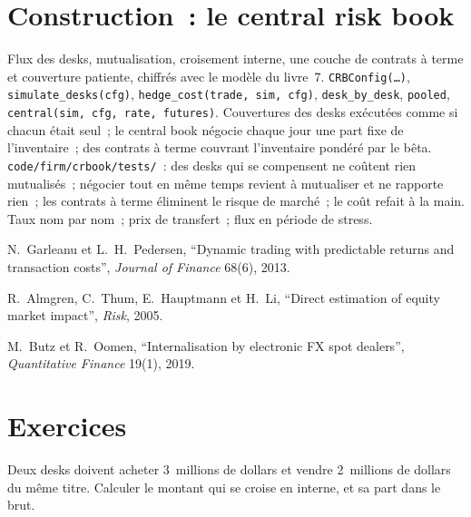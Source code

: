 \section{Construction~: le central risk book}\label{bld:s2:the-central-risk-book:crbook}

\begin{build}
 Flux des desks, mutualisation, croisement interne, une couche de contrats à terme et couverture patiente, chiffrés avec le modèle du livre~7.
 \texttt{CRBConfig(\dots)}, \texttt{simulate\_desks(cfg)}, \texttt{hedge\_cost(trade, sim, cfg)}, \texttt{desk\_by\_desk},
\texttt{pooled}, \texttt{central(sim, cfg, rate, futures)}.
 Couvertures des desks exécutées comme si chacun était seul~; le central book négocie chaque jour une part fixe de l'inventaire~; des contrats à terme
couvrant l'inventaire pondéré par le bêta.
 \texttt{code/firm/crbook/tests/}~: des desks qui se compensent ne coûtent rien mutualisés~; négocier tout en même temps revient à mutualiser et
ne rapporte rien~; les contrats à terme éliminent le risque de marché~; le coût refait à la main.
 Taux nom par nom~; prix de transfert~; flux en période de stress.
\end{build}

\begin{omsources}
\item N.~Garleanu et L.~H.~Pedersen, ``Dynamic trading with predictable returns and transaction costs'', \emph{Journal of Finance} 68(6), 2013.
\item R.~Almgren, C.~Thum, E.~Hauptmann et H.~Li, ``Direct estimation of equity market impact'', \emph{Risk}, 2005.
\item M.~Butz et R.~Oomen, ``Internalisation by electronic FX spot dealers'', \emph{Quantitative Finance} 19(1), 2019.
\end{omsources}

\section{Exercices}

\begin{exercise}[$\star$]\label{exo:s2:the-central-risk-book:1}
Deux desks doivent acheter 3~millions de dollars et vendre 2~millions de dollars du même titre. Calculer le montant qui se croise en interne, et sa part dans le brut.
\end{exercise}

